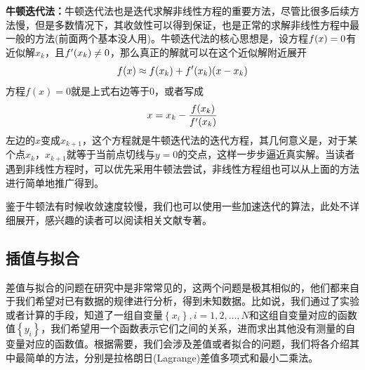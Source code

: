 \documentclass[12pt,a4paper,openany,twoside]{book}
\numberwithin{equation}{section}
\begin{document}
            \textbf{牛顿迭代法：}牛顿迭代法也是迭代求解非线性方程的重要方法，尽管比很多后续方法慢，但是多数情况下，其收敛性可以得到保证，也是正常的求解非线性方程中最一般的方法(前面两个基本没人用)。牛顿迭代法的核心思想是，设方程$f\qty(x)=0$有近似解$x_k$，且$f'\qty(x_k)\neq0$，那么真正的解就可以在这个近似解附近展开
            \begin{equation*}
              f(x) \approx f\qty(x_k)+f'\qty(x_k)\qty(x-x_k)
            \end{equation*}
            方程$f(x)=0$就是上式右边等于0，或者写成
            \begin{equation*}
              x=x_k-\frac{f\qty(x_k)}{f'\qty(x_k)}
            \end{equation*}
            左边的$x$变成$x_{k+1}$，这个方程就是牛顿迭代法的迭代方程，其几何意义是，对于某个点$x_k$，$x_{k+1}$就等于当前点切线与$y=0$的交点，这样一步步逼近真实解。当读者遇到非线性方程时，可以优先采用牛顿法尝试，非线性方程组也可以从上面的方法进行简单地推广得到。

            鉴于牛顿法有时候收敛速度较慢，我们也可以使用一些加速迭代的算法，此处不详细展开，感兴趣的读者可以阅读相关文献专著。
          \subsection{插值与拟合}
            差值与拟合的问题在研究中是非常常见的，这两个问题是极其相似的，他们都来自于我们希望对已有数据的规律进行分析，得到未知数据。比如说，我们通过了实验或者计算的手段，知道了一组自变量$\left\{x_i\right\},i=1,2,\dots,N$和这组自变量对应的函数值$\left\{y_i\right\}$，我们希望用一个函数表示它们之间的关系，进而求出其他没有测量的自变量对应的函数值。根据需要，我们会涉及差值或者拟合的问题，我们将各介绍其中最简单的方法，分别是拉格朗日(Lagrange)差值多项式和最小二乘法。
\end{document}
